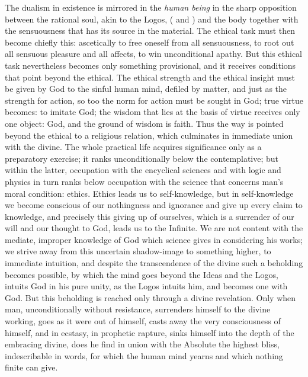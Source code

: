 The dualism in existence is mirrored in the \emph{human being} in the
sharp opposition between the rational soul, akin to the Logos,
( and ) and the body together with the sensuousness
that has its source in the material. The ethical task must then become
chiefly this: ascetically to free oneself from all sensuousness, to root
out all sensuous pleasure and all affects, to win unconditional apathy.
But this ethical task nevertheless becomes only something provisional,
and it receives conditions that point beyond the ethical. The ethical
strength and the ethical insight must be given by God to the sinful
human mind, defiled by matter, and just as the strength for action, so
too the norm for
action must be sought in God; true virtue becomes: to
imitate God; the wisdom that lies at the basis of virtue receives only
one object: God, and the ground of wisdom is faith. Thus the way is
pointed beyond the ethical to a religious relation, which culminates in
immediate union with the divine. The whole practical life acquires
significance only as a preparatory exercise; it ranks unconditionally
below the contemplative; but within the latter, occupation with the
encyclical sciences and with logic and physics in turn ranks below
occupation with the science that concerns man's moral condition:
ethics. Ethics leads us to self-knowledge, but in self-knowledge we
become conscious of our nothingness and ignorance and give up every
claim to knowledge, and precisely this giving up of ourselves, which is
a surrender of our will and our thought to God, leads us to the
Infinite.
We are not content with the mediate, improper knowledge of God which
science gives in considering his works; we strive away from this
uncertain shadow-image to something higher, to immediate intuition, and
despite the transcendence of the divine such a beholding becomes
possible, by which the mind goes beyond the Ideas and the Logos,
intuits God in his pure unity, as the Logos intuits him, and becomes
one with God. But this beholding is reached only through a divine
revelation. Only when man, unconditionally without resistance,
surrenders himself to the divine working, goes as it were out of
himself, casts away the very consciousness of himself, and in ecstasy,
in prophetic rapture, sinks himself into the depth of the embracing
divine, does he find in union with the Absolute the highest bliss,
indescribable in words, for which the human mind yearns and which
nothing finite can give.

\divrule

